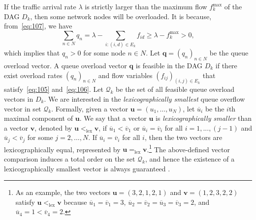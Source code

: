 \documentclass{sig-alternate-2013}
\newcommand{\lex}{\operatorname{lex}}
\begin{document}
If the traffic arrival rate $\lambda$ is strictly larger than the maximum flow $f^{\max}_{k}$ of the DAG $D_{k}$, then some network nodes will be overloaded. It is because, from~\eqref{eq:107}, we have
\begin{equation} \label{eq:201}
\sum_{n\in N} q_{n} = \lambda - \sum_{i: (i, d) \in E_{k}} f_{id} \geq \lambda - f^{\max}_{k} > 0,
\end{equation}
which implies that $q_{n}>0$ for some node $n\in N$. Let $\bm{q}=(q_{n})_{n\in N}$ be the queue overload vector. A queue overload vector $\bm{q}$ is feasible in the DAG $D_{k}$ if there exist overload rates $(q_{n})_{n\in N}$ and flow variables $(f_{ij})_{(i, j)\in E_{k}}$ that satisfy~\eqref{eq:105} and~\eqref{eq:106}. Let $\mathcal{Q}_{k}$ be the set of all feasible queue overload vectors in $D_{k}$. We are interested in the \emph{lexicographically smallest} queue overflow vector in set $\mathcal{Q}_{k}$. Formally, given a vector $\bm{u} = (u_{1}, \ldots, u_{N})$, let $\overline{u}_{i}$ be the $i$th maximal component of $\bm{u}$. We say that a vector $\bm{u}$ is \emph{lexicographically smaller} than a vector $\bm{v}$, denoted by $\bm{u} <_{\lex} \bm{v}$, if $\overline{u}_{1} < \overline{v}_{1}$ or $\overline{u}_{i} = \overline{v}_{i}$ for all $i=1, ..., (j-1)$ and $\overline{u}_{j} < \overline{v}_{j}$ for some $j=2,\dots, N$. If $\overline{u}_{i} = \overline{v}_{i}$ for all $i$, then the two vectors are lexicographically equal, represented by $\bm{u} =_{\lex} \bm{v}$.\footnote{As an example, the two vectors $\bm{u}=(3, 2, 1, 2, 1)$ and $\bm{v}=(1, 2, 3, 2, 2)$ satisfy $\bm{u} <_{\lex} \bm{v}$ because $\overline{u}_{1} = \overline{v}_{1} = 3$, $\overline{u}_{2} = \overline{v}_{2} = \overline{u}_{3} = \overline{v}_{3} = 2$, and $\overline{u}_{4} =1 < \overline{v}_{4} = 2$.} 
The above-defined vector comparison induces a total order on the set  $\mathcal{Q}_{k}$, and hence the existence of a lexicographically smallest vector is always   guaranteed \cite{georgatsos}. 
\end{document}
